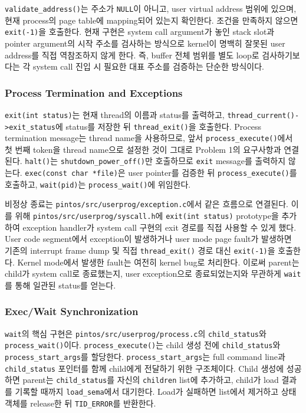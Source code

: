 \documentclass[conference]{IEEEtran}
\newcommand{\codefont}[1]{\texttt{\color{darkmagenta}#1}}
\begin{document}
\codefont{validate\_address()}는 주소가 \codefont{NULL}이 아니고, user virtual address 범위에 있으며, 현재 process의 page table에 mapping되어 있는지 확인한다. 조건을 만족하지 않으면 \codefont{exit(-1)}을 호출한다. 현재 구현은 system call argument가 놓인 stack slot과 pointer argument의 시작 주소를 검사하는 방식으로 kernel이 명백히 잘못된 user address를 직접 역참조하지 않게 한다. 즉, buffer 전체 범위를 별도 loop로 검사하기보다는 각 system call 진입 시 필요한 대표 주소를 검증하는 단순한 방식이다.

\subsubsection{Process Termination and Exceptions}

\codefont{exit(int status)}는 현재 thread의 이름과 status를 출력하고, \codefont{thread\_current()-\textgreater{}exit\_status}에 status를 저장한 뒤 \codefont{thread\_exit()}을 호출한다. Process termination message는 thread name을 사용하므로, 앞서 \codefont{process\_execute()}에서 첫 번째 token을 thread name으로 설정한 것이 그대로 Problem 1의 요구사항과 연결된다. \codefont{halt()}는 \codefont{shutdown\_power\_off()}만 호출하므로 \codefont{exit} message를 출력하지 않는다. \codefont{exec(const char *file)}은 user pointer를 검증한 뒤 \codefont{process\_execute()}를 호출하고, \codefont{wait(pid)}는 \codefont{process\_wait()}에 위임한다.

비정상 종료는 \codefont{pintos/src/userprog/exception.c}에서 같은 흐름으로 연결된다. 이를 위해 \codefont{pintos/src/userprog/syscall.h}에 \codefont{exit(int status)} prototype을 추가하여 exception handler가 system call 구현의 exit 경로를 직접 사용할 수 있게 했다. User code segment에서 exception이 발생하거나 user mode page fault가 발생하면 기존의 interrupt frame dump 및 직접 \codefont{thread\_exit()} 경로 대신 \codefont{exit(-1)}을 호출한다. Kernel mode에서 발생한 fault는 여전히 kernel bug로 처리한다. 이로써 parent는 child가 system call로 종료했는지, user exception으로 종료되었는지와 무관하게 \codefont{wait}를 통해 일관된 status를 얻는다.

\subsubsection{Exec/Wait Synchronization}

\codefont{wait}의 핵심 구현은 \codefont{pintos/src/userprog/process.c}의 \codefont{child\_status}와 \codefont{process\_wait()}이다. \codefont{process\_execute()}는 child 생성 전에 \codefont{child\_status}와 \codefont{process\_start\_args}를 할당한다. \codefont{process\_start\_args}는 full command line과 \codefont{child\_status} 포인터를 함께 child에게 전달하기 위한 구조체이다. Child 생성에 성공하면 parent는 \codefont{child\_status}를 자신의 \codefont{children} list에 추가하고, child가 load 결과를 기록할 때까지 \codefont{load\_sema}에서 대기한다. Load가 실패하면 list에서 제거하고 상태 객체를 release한 뒤 \codefont{TID\_ERROR}를 반환한다.
\end{document}
